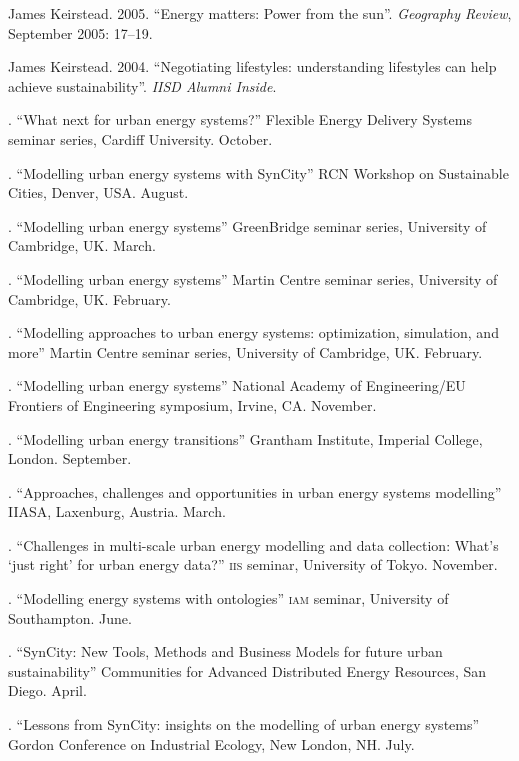 \documentclass[11pt,a4paper]{article}
\begin{document}
\ind James Keirstead. 2005. ``Energy matters: Power from the sun''.  \emph{Geography Review}, September 2005: 17--19.

\ind James Keirstead. 2004. ``Negotiating lifestyles: understanding lifestyles can help achieve sustainability''. \emph{IISD Alumni Inside}.

 \bigskip

\noindent{}%
%
. ``What next for urban energy systems?'' Flexible Energy Delivery Systems seminar series, Cardiff University. October.

. ``Modelling urban energy systems with SynCity'' RCN Workshop on Sustainable Cities, Denver, USA.  August.

. ``Modelling urban energy systems'' GreenBridge seminar series, University of Cambridge, UK. March.

. ``Modelling urban energy systems'' Martin Centre seminar series, University of Cambridge, UK. February.

. ``Modelling approaches to urban energy systems: optimization, simulation, and more'' Martin Centre seminar series, University of Cambridge, UK. February.

. ``Modelling urban energy systems'' National Academy of Engineering/EU Frontiers of Engineering symposium, Irvine, CA. November.

. ``Modelling urban energy transitions'' Grantham Institute, Imperial College, London. September.

. ``Approaches, challenges and opportunities in urban energy systems modelling'' IIASA, Laxenburg, Austria. March.

. ``Challenges in multi-scale urban energy modelling and data collection: What's `just right' for urban energy data?'' \textsc{iis} seminar, University of Tokyo. November.

. ``Modelling energy systems with ontologies'' \textsc{iam} seminar, University of Southampton. June.

. ``SynCity: New Tools, Methods and Business Models for future urban sustainability'' Communities for Advanced Distributed Energy Resources, San Diego.  April.

. ``Lessons from SynCity: insights on the modelling of urban energy systems'' Gordon Conference on Industrial Ecology, New London, NH.  July.
\end{document}
